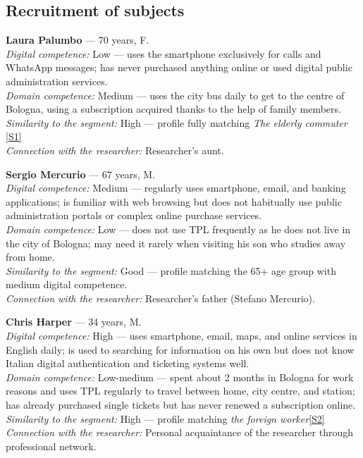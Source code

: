 ﻿\documentclass[11pt,a4paper]{article}
\begin{document}
\vspace{0.2cm}

\subsection*{Recruitment of subjects}
\begin{tcolorbox}[base]

\textbf{Laura Palumbo} --- 70 years, F.\\[0.3cm]
\textit{Digital competence:} Low --- uses the smartphone
exclusively for calls and WhatsApp messages; has never
purchased anything online or used digital public
administration services.\\[0.2cm]
\textit{Domain competence:} Medium --- uses the city bus
daily to get to the centre of Bologna, using
a subscription acquired thanks to the help of family members.\\[0.2cm]
\textit{Similarity to the segment:} High --- profile
fully matching \textit{The elderly commuter}
\hyperref[seg:anziana]{[S1]}\\[0.2cm]
\textit{Connection with the researcher:} Researcher's aunt.

\vspace{0.2cm}

\textbf{Sergio Mercurio} --- 67 years, M.\\[0.3cm]
\textit{Digital competence:} Medium --- regularly uses
smartphone, email, and banking applications; is familiar
with web browsing but does not habitually use public
administration portals or complex online
purchase services.\\[0.2cm]
\textit{Domain competence:} Low --- does not use
TPL frequently as he does not live in the city of Bologna; may need it rarely when visiting his son who studies away from home.\\[0.2cm]
\textit{Similarity to the segment:} Good --- profile
matching the 65+ age group with medium digital competence.\\[0.2cm]
\textit{Connection with the researcher:} Researcher's father
(Stefano Mercurio).

\vspace{0.2cm}

\textbf{Chris Harper} --- 34 years, M.\\[0.3cm]
\textit{Digital competence:} High --- uses smartphone,
email, maps, and online services in English daily; is used
to searching for information on his own but does not know
Italian digital authentication and ticketing systems well.\\[0.2cm]
\textit{Domain competence:} Low-medium --- spent about 2 months in Bologna for work reasons and uses TPL
regularly to travel between home, city centre, and station; has already
purchased single tickets but has never renewed a
subscription online.\\[0.2cm]
\textit{Similarity to the segment:} High --- profile
matching \textit{the foreign worker}\hyperref[seg:straniero]{[S2]}\\[0.2cm]
\textit{Connection with the researcher:} Personal acquaintance
of the researcher through professional network.


\end{tcolorbox}
\end{document}
